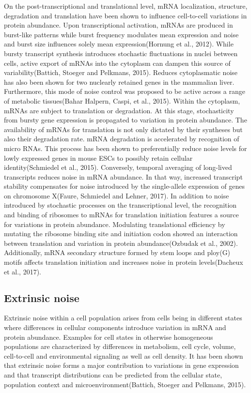 On the post-transcriptional and translational level, mRNA localization, structure, degradation and translation have been shown to influence cell-to-cell variations in protein abundance. 
Upon transcriptional activation, mRNAs are produced in burst-like patterns while burst frequency modulates mean expression and noise and burst size influences solely mean expression(Hornung et al., 2012). While bursty transcript synthesis introduces stochastic fluctuations in nuclei between cells, active export of mRNAs into the cytoplasm can dampen this source of variability(Battich, Stoeger and Pelkmans, 2015). Reduces cytoplasmatic noise has also been shown for two nuclearly retained genes in the mammalian liver. Furthermore, this mode of noise control was proposed to be active across a range of metabolic tissues(Bahar Halpern, Caspi, et al., 2015).
Within the cytoplasm, mRNAs are subject to translation or degradation. At this stage, stochasticity from bursty gene expression is propagated to variation in protein abundance. The availability of mRNAs for translation is not only dictated by their syntheses but also their degradation rate. mRNA degradation is accelerated by recognition of micro RNAs. This process has been shown to preferentially reduce noise levels for lowly expressed genes in mouse ESCs to possibly retain cellular identity(Schmiedel et al., 2015). Conversely, temporal averaging of long-lived transcripts reduces noise in mRNA abundance. In that way, increased transcript stability compensates for noise introduced by the single-allele expression of genes on chromosome X(Faure, Schmiedel and Lehner, 2017).  
In addition to noise introduced by stochastic processes on the transcriptional level, the recognition and binding of ribosomes to mRNAs for translation initiation features a source for variations in protein abundance. Modulating translational efficiency by mutating the ribosome binding site and initiation codon showed an interaction between translation and variation in protein abundance(Ozbudak et al., 2002). Additionally, mRNA secondary structure formed by stem loops and ploy(G) motifs affects translation initiation and increases noise in protein levels(Dacheux et al., 2017).

\subsection{Extrinsic noise}

Extrinsic noise within a cell population arises from cells being in different states where differences in cellular components introduce variation in mRNA and protein abundance. Examples for cell states in otherwise homogeneous populations are characterized by differences in metabolism, cell cycle, volume, cell-to-cell and environmental signaling as well as cell density. It has been shown that extrinsic noise forms a major contribution to variations in gene expression and that transcript distributions can be predicted from the cellular state, population context and microenvironment(Battich, Stoeger and Pelkmans, 2015).

